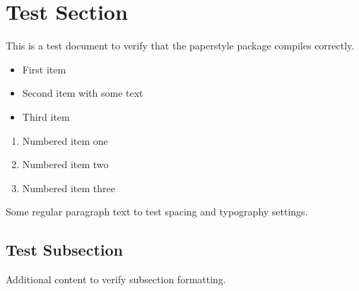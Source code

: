 \documentclass{article}
\begin{document}
\section{Test Section}
This is a test document to verify that the paperstyle package compiles correctly.

\begin{itemize}
    \item First item
    \item Second item with some text
    \item Third item
\end{itemize}

\begin{enumerate}
    \item Numbered item one
    \item Numbered item two
    \item Numbered item three
\end{enumerate}

Some regular paragraph text to test spacing and typography settings.

\subsection{Test Subsection}
Additional content to verify subsection formatting.
\end{document}
